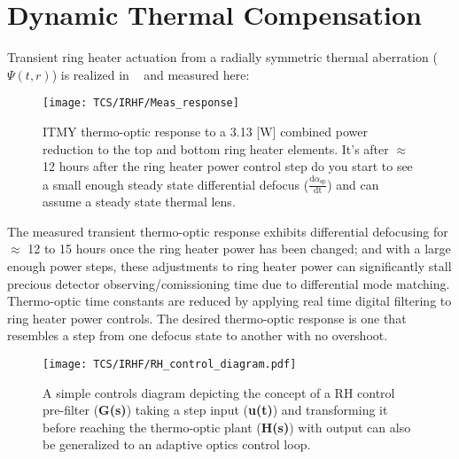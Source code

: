 \section{Dynamic Thermal Compensation}
Transient ring heater actuation from a radially symmetric thermal aberration ($\Psi(t,r)$) is realized in ~\cite{ramette:2016} and measured here:

\begin{figure}[H]
    \centering
     \texttt{[image: TCS/IRHF/Meas\_response]}
     \caption{ITMY thermo-optic response to a 3.13 [W] combined power reduction to the top and bottom ring heater elements. It's after $\approx$ 12 hours after the ring heater power control step do you start to see a small enough steady state differential defocus ($\frac{\mathrm{d} \alpha_\mathrm{sp}}{\mathrm{dt}}$) and can assume a steady state thermal lens. }
     \label{fig:RHresp}
\end{figure}

The measured transient thermo-optic response exhibits differential defocusing for $\approx$ 12 to 15 hours once the ring heater power has been changed; and with a large enough power steps, these adjustments to ring heater power can significantly stall precious detector observing/comissioning time due to differential mode matching. Thermo-optic time constants are reduced by applying real time digital filtering to ring heater power controls. The desired thermo-optic response is one that resembles a step from one defocus state to another with no overshoot. 

\begin{figure}[H]
	\centering
	\texttt{[image: TCS/IRHF/RH\_control\_diagram.pdf]}
	\caption{A simple controls diagram depicting the concept of a RH control pre-filter (\textbf{G(s)}) taking a step input (\textbf{u(t)}) and transforming it before reaching the thermo-optic plant (\textbf{H(s)}) with output can also be generalized to an adaptive optics control loop.}
	\label{fig:RH_control}
\end{figure}

